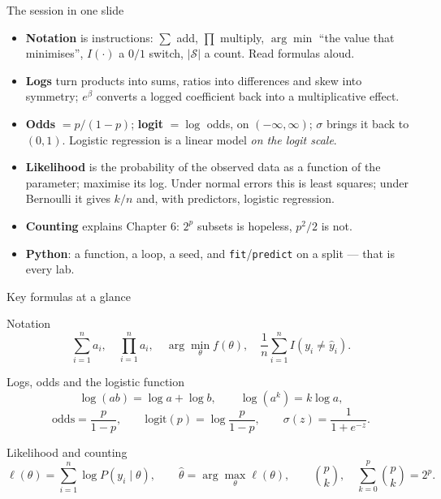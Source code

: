 \documentclass[aspectratio=169,11pt]{beamer}
\begin{document}
\begin{frame}{The session in one slide}
  \footnotesize
  \begin{itemize}
    \item \textbf{Notation} is instructions: $\sum$ add, $\prod$ multiply,
          $\arg\min$ ``the value that minimises'', $I(\cdot)$ a $0/1$ switch,
          $|\mathcal{S}|$ a count. Read formulas aloud.
    \item \textbf{Logs} turn products into sums, ratios into differences and
          skew into symmetry; $e^{\beta}$ converts a logged coefficient back
          into a multiplicative effect.
    \item \textbf{Odds} $= p/(1-p)$; \textbf{logit} $= \log$ odds, on
          $(-\infty,\infty)$; $\sigma$ brings it back to $(0,1)$. Logistic
          regression is a linear model \emph{on the logit scale}.
    \item \textbf{Likelihood} is the probability of the observed data as a
          function of the parameter; maximise its log. Under normal errors this
          is least squares; under Bernoulli it gives $k/n$ and, with
          predictors, logistic regression.
    \item \textbf{Counting} explains Chapter 6: $2^p$ subsets is hopeless,
          $p^2/2$ is not.
    \item \textbf{Python}: a function, a loop, a seed, and
          \texttt{fit}/\texttt{predict} on a split --- that is every lab.
  \end{itemize}
\end{frame}

\begin{frame}{Key formulas at a glance}
  \footnotesize
  \begin{block}{Notation}
    \[
      \sum_{i=1}^{n} a_i, \quad \prod_{i=1}^{n} a_i, \quad
      \arg\min_\theta f(\theta), \quad
      \frac{1}{n}\sum_{i=1}^n I(y_i \ne \hat y_i) .
    \]
  \end{block}
  \begin{block}{Logs, odds and the logistic function}
    \[
      \log(ab) = \log a + \log b, \qquad \log(a^k) = k \log a,
    \]
    \[
      \mathrm{odds} = \frac{p}{1-p}, \qquad
      \mathrm{logit}(p) = \log\frac{p}{1-p}, \qquad
      \sigma(z) = \frac{1}{1+e^{-z}} .
    \]
  \end{block}
  \begin{block}{Likelihood and counting}
    \[
      \ell(\theta) = \sum_{i=1}^{n}\log P(y_i \mid \theta),
      \qquad
      \hat\theta = \arg\max_\theta \ell(\theta),
      \qquad
      \binom{p}{k}, \quad \sum_{k=0}^p \binom{p}{k} = 2^p .
    \]
  \end{block}
\end{frame}
\end{document}
